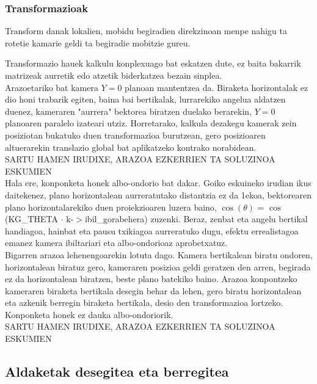 \documentclass[12pt]{article}
\begin{document}
\subsubsection{Transformazioak}

Transform danak lokalien, mobidu begiradien direkzinoan menpe nahigu ta rotetie kamarie geldi ta begiradie mobitzie gureu.

Transformazio hauek kalkulu konplexuago bat eskatzen dute, ez baita bakarrik matrizeak aurretik edo atzetik biderkatzea bezain sinplea.\\
Arazoetariko bat kamera $Y=0$ planoan mantentzea da. Biraketa horizontalak ez dio honi trabarik egiten, baina bai bertikalak, lurrarekiko angelua aldatzen duenez, kameraren "aurrera" bektorea  biratzen duelako berarekin, $Y=0$ planoaren paralelo izateari utziz. Horretarako, kalkula dezakegu kamerak zein posiziotan bukatuko duen transformazioa burutzean, gero posizioaren altuerarekin translazio global bat aplikatzeko kontrako norabidean.\\

SARTU HAMEN IRUDIXE, ARAZOA EZKERRIEN TA SOLUZINOA ESKUMIEN\\

Hala ere, konponketa honek albo-ondorio bat dakar. Goiko eskuineko irudian ikus daitekenez, plano horizontalean aurreratutako distantzia ez da 1ekoa, bektorearen plano horizontalarekiko duen proiekzioaren luzera baino, $\cos(\theta)$ = $\cos$(KG\_THETA $\cdot$ k-$>$ibil\_gorabehera) zuzenki. Beraz, zenbat eta angelu bertikal handiagoa, hainbat eta pausu txikiagoa aurreratuko dugu, efektu errealistagoa emanez kamera ibiltariari eta albo-ondorioaz aprobetxatuz.\\

Bigarren arazoa lehenengoarekin lotuta dago. Kamera bertikalean biratu ondoren, horizontalean biratuz gero, kameraren posizioa geldi geratzen den arren, begirada ez da horizontalean biratzen, beste plano batekiko baino. Arazoa konpontzeko kameraren biraketa bertikala desegin behar da lehen, gero biratu horizontalean eta azkenik berregin biraketa bertikala, desio den transformazioa lortzeko. Konponketa honek ez dauka albo-ondoriorik.\\

SARTU HAMEN IRUDIXE, ARAZOA EZKERRIEN TA SOLUZINOA ESKUMIEN\\


\subsection{Aldaketak desegitea eta berregitea}
\end{document}
